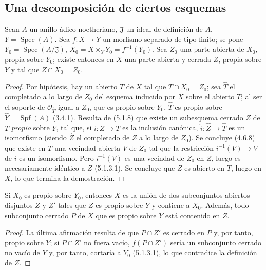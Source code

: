 \subsection{Una descomposición de ciertos esquemas}
\label{subsection:III.5.5}
\label{subsection:III.5.5-fr}

\begin{proposition}[5.5.1]
\label{III.5.5.1-fr}
Sean $A$ un anillo ádico noetheriano, $\mathfrak J$ un ideal de definición
de $A$, $Y=\operatorname{Spec}(A)$. Sea $f:X\to Y$ un morfismo separado de
tipo finito; se pone $Y_0=\operatorname{Spec}(A/\mathfrak J)$,
$X_0=X\times_Y Y_0=f^{-1}(Y_0)$. Sea $Z_0$ una parte abierta de $X_0$,
propia sobre $Y_0$; existe entonces en $X$ una parte abierta y cerrada $Z$,
propia sobre $Y$ y tal que $Z\cap X_0=Z_0$.
\end{proposition}

\begin{proof}
Por hipótesis, hay un abierto $T$ de $X$ tal que $T\cap X_0=Z_0$; sea
$\widehat T$ el completado a lo largo de $Z_0$ del esquema inducido por $X$ sobre
el abierto $T$; al ser el soporte de $\mathcal O_{\widehat T}$ igual a $Z_0$, que es
propio sobre $Y_0$, $\widehat T$ es propio sobre
$\widehat Y=\operatorname{Spf}(A)$ (3.4.1). Resulta de (5.1.8) que existe
un subesquema cerrado $Z$ de $T$ \emph{propio} sobre $Y$, tal que, si $i:Z\to T$ es
la inclusión canónica, $\widehat i:\widehat Z\to\widehat T$ es un
isomorfismo (siendo $\widehat Z$ el completado de $Z$ a lo largo de $Z_0$). Se
concluye (4.6.8) que existe en $T$ una vecindad abierta $V$ de $Z_0$ tal que
la restricción $i^{-1}(V)\to V$ de $i$ es un isomorfismo. Pero
$i^{-1}(V)$ es una vecindad de $Z_0$ en $Z$, luego es necesariamente
idéntico a $Z$ (5.1.3.1). Se concluye que $Z$ es abierto en $T$, luego
en $X$, lo que termina la demostración.
\end{proof}

\begin{corollary}[5.5.2]
\label{III.5.5.2}
\label{III.5.5.2-fr}
Si $X_0$ es propio sobre $Y_0$, entonces $X$ es la unión de dos
subconjuntos abiertos disjuntos $Z$ y $Z'$ tales que $Z$ es propio sobre
$Y$ y contiene a $X_0$. Además, todo subconjunto cerrado $P$ de $X$
que es propio sobre $Y$ está contenido en $Z$.
\end{corollary}

\begin{proof}
La última afirmación resulta de que $P\cap Z'$ es cerrado en $P$ y, por tanto, propio
sobre $Y$; si $P\cap Z'$ no fuera vacío, $f(P\cap Z')$ sería un subconjunto cerrado
no vacío de $Y$ y, por tanto, cortaría a $Y_0$ (5.1.3.1), lo que contradice la
definición de $Z$.
\end{proof}

